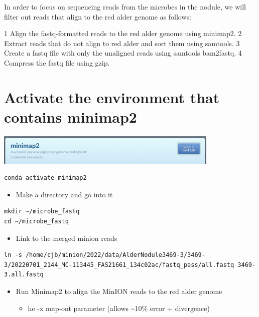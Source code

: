 \documentclass[
]{book}
\providecommand{\tightlist}{%
  \setlength{\itemsep}{0pt}\setlength{\parskip}{0pt}}
\begin{document}
In order to focus on sequencing reads from the microbes in the nodule, we will filter out reads that align to the red alder genome as follows:

1 Align the fastq-formatted reads to the red alder genome using minimap2.
2 Extract reads that do not align to red alder and sort them using samtools.
3 Create a fastq file with only the unaligned reads using samtools bam2fastq.
4 Compress the fastq file using gzip.

\hypertarget{activate-the-environment-that-contains-minimap2}{%
\section{Activate the environment that contains minimap2}\label{activate-the-environment-that-contains-minimap2}}

\includegraphics[width=0.8\textwidth,height=\textheight]{Figures/minimap2.png}

\begin{verbatim}
conda activate minimap2
\end{verbatim}

\begin{itemize}
\tightlist
\item
  Make a directory and go into it
\end{itemize}

\begin{verbatim}
mkdir ~/microbe_fastq
cd ~/microbe_fastq
\end{verbatim}

\begin{itemize}
\tightlist
\item
  Link to the merged minion reads
\end{itemize}

\begin{verbatim}
ln -s /home/cjb/minion/2022/data/AlderNodule3469-3/3469-3/20220701_2144_MC-113445_FAS21661_134c02ac/fastq_pass/all.fastq 3469-3.all.fastq
\end{verbatim}

\begin{itemize}
\tightlist
\item
  Run Minimap2 to align the MinION reads to the red alder genome

  \begin{itemize}
  \tightlist
  \item
    he -x map-ont parameter (allows \textasciitilde10\% error + divergence)
  \end{itemize}
\end{itemize}
\end{document}
